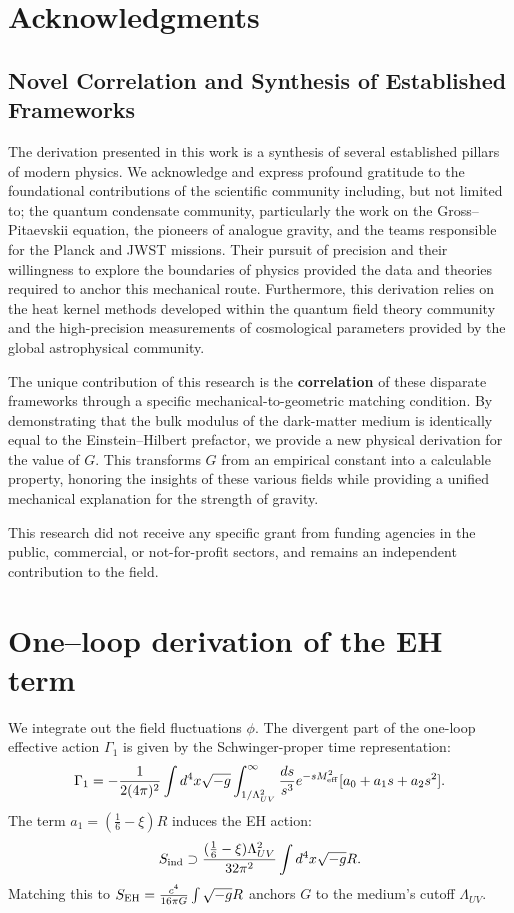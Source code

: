 \documentclass[11pt,a4paper]{article}
\begin{document}
\section*{Acknowledgments}
\subsection{Novel Correlation and Synthesis of Established Frameworks}
The derivation presented in this work is a synthesis of several established pillars of modern physics. We acknowledge and express profound gratitude to the foundational contributions of the scientific community including, but not limited to; the quantum condensate community, particularly the work on the Gross--Pitaevskii equation, the pioneers of analogue gravity, and the teams responsible for the Planck and JWST missions. Their pursuit of precision and their willingness to explore the boundaries of physics provided the data and theories required to anchor this mechanical route. Furthermore, this derivation relies on the heat kernel methods developed within the quantum field theory community and the high-precision measurements of cosmological parameters provided by the global astrophysical community.


The unique contribution of this research is the \textbf{correlation} of these disparate frameworks through a specific mechanical-to-geometric matching condition. By demonstrating that the bulk modulus of the dark-matter medium is identically equal to the Einstein--Hilbert prefactor, we provide a new physical derivation for the value of $G$. This transforms $G$ from an empirical constant into a calculable property, honoring the insights of these various fields while providing a unified mechanical explanation for the strength of gravity.


This research did not receive any specific grant from funding agencies in the public, commercial, or not-for-profit sectors, and remains an independent contribution to the field.

\appendix
\section{One--loop derivation of the EH term}
\label{app:one-loop}

We integrate out the field fluctuations $\phi$. The divergent part of the one-loop effective action $\Gamma_{1}$ is given by the Schwinger-proper time representation:\cite{Vassilevich03,Schwinger1951}
\begin{equation}
\Gamma_{1} = -\frac{1}{2(4\pi)^2} \int d^4x \sqrt{-g} \int_{1/\Lambda_{UV}^2}^\infty \frac{ds}{s^3} e^{-sM_{\rm eff}^2} [a_0 + a_1 s + a_2 s^2].
\end{equation}
The term $a_1 = (\tfrac{1}{6}-\xi)R$ induces the EH action:
\begin{equation}
S_{\rm ind} \supset \frac{(\tfrac{1}{6}-\xi)\Lambda_{UV}^2}{32\pi^2} \int d^4x \sqrt{-g} R.
\end{equation}
Matching this to $S_{\rm EH} = \frac{c^4}{16\pi G} \int \sqrt{-g} R$ anchors $G$ to the medium's cutoff $\Lambda_{UV}$.
\end{document}
